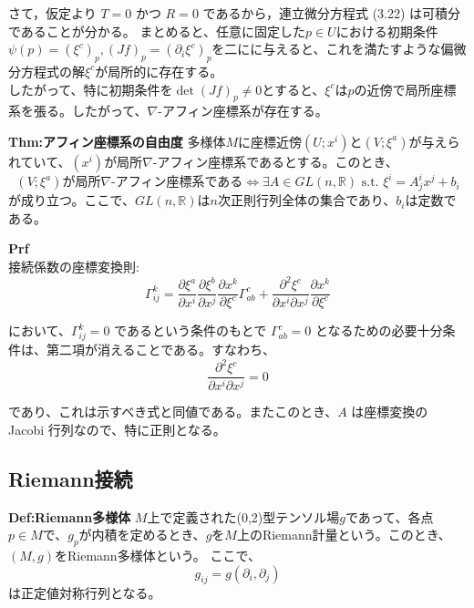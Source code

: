 \documentclass[a4paper,11pt]{jsarticle}
\numberwithin{equation}{section}
\begin{document}
さて，仮定より \(T = 0\) かつ \(R = 0\) であるから，連立微分方程式 (3.22) は可積分であることが分かる。
まとめると、任意に固定した$p \in U$における初期条件$\psi(p)=(\xi^c)_p,(Jf)_p=(\partial_i \xi^c)_p$を二にに与えると、これを満たすような偏微分方程式の解$\xi^c$が局所的に存在する。\\
したがって、特に初期条件を$\det(Jf)_p\neq 0$とすると、$\xi^c$は$p$の近傍で局所座標系を張る。したがって、$\nabla$-アフィン座標系が存在する。\hfill\qedsymbol

\begin{itembox}[l]{\textbf{Thm:アフィン座標系の自由度}}
    多様体$M$に座標近傍$(U;x^i)$と$(V;\xi^a)$が与えられていて、$(x^i)$が局所$\nabla$-アフィン座標系であるとする。このとき、
    \begin{equation}
        (V;\xi^a)\text{が局所$\nabla$-アフィン座標系である} \Leftrightarrow \exists A \in GL(n,\mathbb{R}) \text{ s.t. } \xi^i = A^i_jx^j + b_i
    \end{equation}
    が成り立つ。ここで、$GL(n,\mathbb{R})$は$n$次正則行列全体の集合であり、$b_i$は定数である。
\end{itembox}
\textbf{Prf}\\
接続係数の座標変換則:
\begin{equation}
    \Gamma^k_{ij} = \frac{\partial \xi^a}{\partial x^i} \frac{\partial \xi^b}{\partial x^j} \frac{\partial x^k}{\partial \xi^c} \Gamma^c_{ab} + \frac{\partial^2 \xi^c}{\partial x^i \partial x^j} \frac{\partial x^k}{\partial \xi^c}
\end{equation}

において、\(\Gamma^k_{ij} = 0\) であるという条件のもとで \(\Gamma^c_{ab} = 0\) となるための必要十分条件は、第二項が消えることである。すなわち、
\begin{equation}
    \frac{\partial^2 \xi^c}{\partial x^i \partial x^j} = 0
\end{equation}

であり、これは示すべき式と同値である。またこのとき、\(A\) は座標変換の Jacobi 行列なので、特に正則となる。\hfill\qedsymbol

\subsection{Riemann接続}
\begin{itembox}[l]{\textbf{Def:Riemann多様体}}
    $M$上で定義された(0,2)型テンソル場$g$であって、各点$p \in M$で、$g_p$が内積を定めるとき、$g$を$M$上のRiemann計量という。このとき、$(M,g)$をRiemann多様体という。
    ここで、
    \begin{equation}
        g_{ij} = g(\partial_{i},\partial_{j})
    \end{equation}
    は正定値対称行列となる。
\end{itembox}
\end{document}
